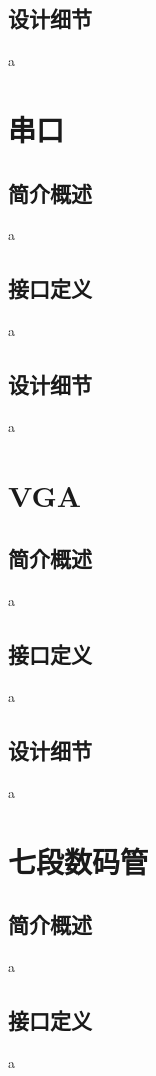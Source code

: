     \subsection{设计细节}
    a

\section{串口}

    \subsection{简介概述}
    a

    \subsection{接口定义}
    a

    \subsection{设计细节}
    a

\section{VGA}

    \subsection{简介概述}
    a

    \subsection{接口定义}
    a

    \subsection{设计细节}
    a

\section{七段数码管}

    \subsection{简介概述}
    a

    \subsection{接口定义}
    a

